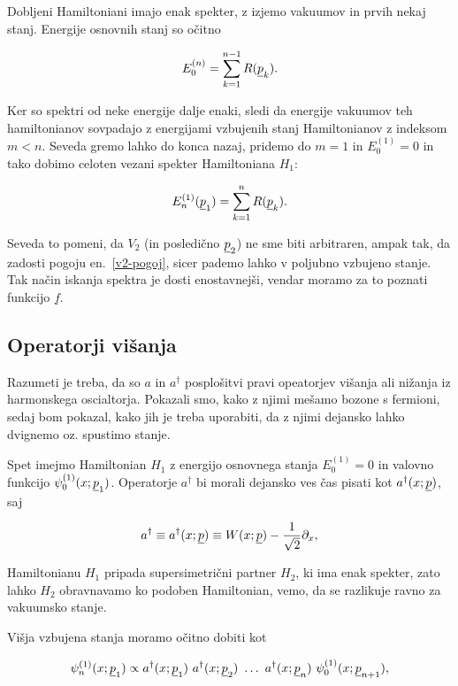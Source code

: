 \ni Dobljeni Hamiltoniani imajo enak spekter, z izjemo vakuumov in prvih nekaj stanj. Energije 
osnovnih stanj so o\v citno

\begin{equation}
	E^{(n)}_0 = \sum_{k = 1}^{n - 1} R(\underline{p}_k).
\end{equation}

Ker so spektri od neke energije dalje enaki, sledi da energije vakuumov teh hamiltonianov sovpadajo z energijami
vzbujenih stanj Hamiltonianov z indeksom $m < n$. Seveda gremo lahko do konca nazaj, pridemo do
$m = 1$ in $E^{(1)}_0 = 0$ in tako dobimo celoten vezani spekter Hamiltoniana $H_1$:

\begin{equation}
	E_n^{(1)} (\underline{p}_1) = \sum_{k = 1}^n R (\underline{p}_k).
	\label{v2-pogoj}
\end{equation}

\ni Seveda to pomeni, da $V_2$ (in posledi\v cno $\underline{p}_2$) ne sme biti arbitraren, ampak tak, da zadosti pogoju
en.~\eqref{v2-pogoj}, sicer pademo lahko v poljubno vzbujeno stanje. Tak na\v cin iskanja spektra je dosti
enostavnej\v si, vendar moramo za to poznati funkcijo $\underline{f}$. 

\subsection{Operatorji vi\v sanja}

Razumeti je treba, da so $a$ in $a^\dagger$ posplo\v sitvi pravi opeatorjev vi\v sanja ali ni\v zanja iz harmonskega
oscialtorja. Pokazali smo, kako z njimi me\v samo bozone s fermioni, sedaj bom pokazal, kako jih
je treba uporabiti, da z njimi dejansko lahko dvignemo oz. spustimo stanje.

Spet imejmo Hamiltonian $H_1$ z energijo osnovnega stanja $E^{(1)}_0 = 0$ in valovno funkcijo
$\psi_0^{(1)} (x; \underline{p}_1)$. Operatorje $a^\dagger$ bi morali dejansko ves \v cas pisati kot $a^\dagger (x; \underline{p})$,
saj

\[
	a^\dagger \equiv a^\dagger (x; \underline{p}) \equiv W(x; \underline{p}) - \frac{1}{\sqrt{2}}\partial_x,
\]

Hamiltonianu $H_1$ pripada supersimetri\v cni partner $H_2$, ki ima enak spekter, zato lahko $H_2$
obravnavamo ko podoben Hamiltonian, vemo, da se razlikuje ravno za vakuumsko stanje.

Vi\v sja vzbujena stanja moramo o\v citno dobiti kot

\begin{equation}
	\psi^{(1)}_n (x; \underline{p}_1) \propto a^\dagger (x;\underline{p}_1)\ a^\dagger (x;\underline{p}_2)\ \ldots\ a^\dagger (x; \underline{p}_n)\
		\psi^{(1)}_0 (x; \underline{p}_{n+1}),
\end{equation}

